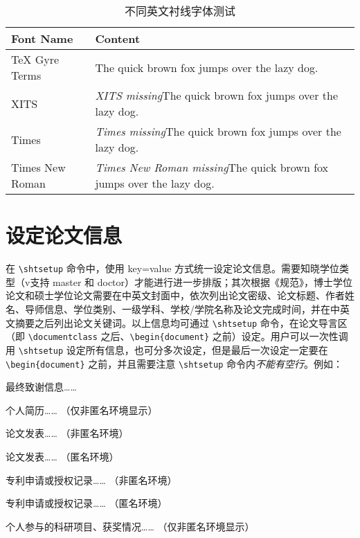 \documentclass[
  fontset = mac,
]{shtthesis}
\providecommand{\timesnewroman}{\emph{Times New Roman missing}}
\providecommand{\timesfamily}{\emph{Times missing}}
\providecommand{\xitsfamily}{\emph{XITS missing}}
\begin{document}
\begin{table}[htb]
  \centering
  \caption{不同英文衬线字体测试}
  \label{tab::serif_fonts}
  \begin{tabular}{ll}
    \toprule
    Font Name & Content \\
    \midrule
    TeX Gyre Terms & {\rmfamily The quick brown fox jumps over the lazy dog.} \\
    XITS & {\xitsfamily The quick brown fox jumps over the lazy dog.} \\
    Times & {\timesfamily The quick brown fox jumps over the lazy dog.} \\
    Times New Roman & {\timesnewroman The quick brown fox jumps over the lazy dog.} \\
    \bottomrule
  \end{tabular}
\end{table}

\section{设定论文信息}
\shtthesis 在 \verb|\shtsetup| 命令中，使用 key=value 方式统一设定论文信息。\shtthesis 需要知晓学位类型（v\version 支持 master 和 doctor）才能进行进一步排版；其次根据《规范》，博士学位论文和硕士学位论文需要在中英文封面中，依次列出论文密级、论文标题、作者姓名、导师信息、学位类别、一级学科、学校/学院名称及论文完成时间，并在中英文摘要之后列出论文关键词。以上信息均可通过 \verb|\shtsetup| 命令，在论文导言区（即 \verb|\documentclass| 之后、\verb|\begin{document}| 之前）设定。用户可以一次性调用 \verb|\shtsetup| 设定所有信息，也可分多次设定，但是最后一次设定一定要在 \verb|\begin{document}| 之前，并且需要注意 \verb|\shtsetup| 命令内\emph{不能有空行}。例如：
\begin{latex}
\end{latex}

\makebiblio

\appendix

\backmatter
\begin{acknowledgement}
  最终致谢信息……
\end{acknowledgement}

\begin{resume}
  个人简历…… （仅非匿名环境显示）
\end{resume}

\begin{publications}
  论文发表…… （非匿名环境）
\end{publications}

\begin{publications*}
  论文发表…… （匿名环境）
\end{publications*}

\begin{patterns}
  专利申请或授权记录…… （非匿名环境）
\end{patterns}

\begin{patterns*}
  专利申请或授权记录…… （匿名环境）
\end{patterns*}

\begin{projects}
  个人参与的科研项目、获奖情况…… （仅非匿名环境显示）
\end{projects}
\end{document}
